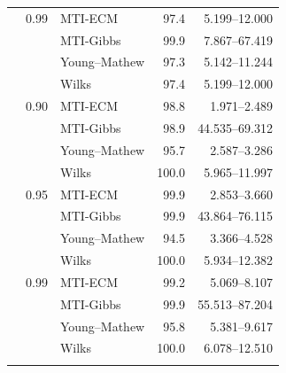 \begin{longtable}{@{}rrlrr@{}}
\addlinespace[0.3em]
500 & 0.99 & MTI-ECM & 97.4 & 5.199--12.000 \\
 &  & MTI-Gibbs & 99.9 & 7.867--67.419 \\
 &  & Young--Mathew & 97.3 & 5.142--11.244 \\
 &  & Wilks & 97.4 & 5.199--12.000 \\
\addlinespace[0.3em]
1000 & 0.90 & MTI-ECM & 98.8 & 1.971--2.489 \\
 &  & MTI-Gibbs & 98.9 & 44.535--69.312 \\
 &  & Young--Mathew & 95.7 & 2.587--3.286 \\
 &  & Wilks & 100.0 & 5.965--11.997 \\
\addlinespace[0.3em]
1000 & 0.95 & MTI-ECM & 99.9 & 2.853--3.660 \\
 &  & MTI-Gibbs & 99.9 & 43.864--76.115 \\
 &  & Young--Mathew & 94.5 & 3.366--4.528 \\
 &  & Wilks & 100.0 & 5.934--12.382 \\
\addlinespace[0.3em]
1000 & 0.99 & MTI-ECM & 99.2 & 5.069--8.107 \\
 &  & MTI-Gibbs & 99.9 & 55.513--87.204 \\
 &  & Young--Mathew & 95.8 & 5.381--9.617 \\
 &  & Wilks & 100.0 & 6.078--12.510 \\
\addlinespace[0.3em]
\end{longtable}
\clearpage
